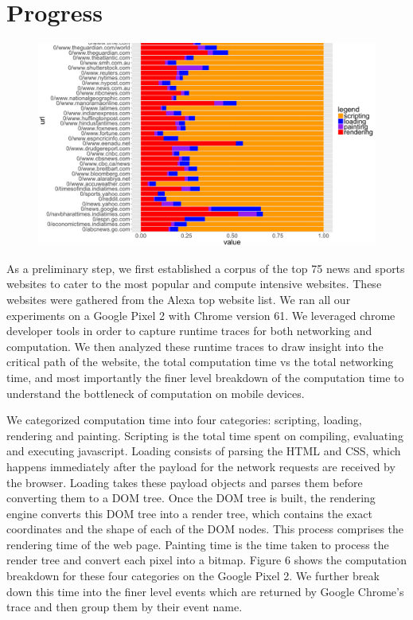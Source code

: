 \section{Progress}
\label{sec:Progress}


\begin{figure}[t!]
\centering
\includegraphics[width=0.99\columnwidth, scale=2.0]{figs/comp_1.png}
\label{fig:act_p2}
\end{figure}

As a preliminary step, we first established a corpus of the top
75 news and sports websites to cater to the most popular and compute intensive websites. 
These websites were gathered from the Alexa top website list.
We ran all our experiments on a Google Pixel 2 with Chrome version 61. We leveraged chrome developer tools in order
to capture runtime traces for both networking and computation. We then analyzed these runtime
traces to draw insight into the critical path of the website, the total computation time vs the total networking time, and most importantly the finer
level breakdown of the computation time to understand the bottleneck of computation on mobile
devices. 

We categorized computation time into four categories: scripting, loading, rendering and
painting. Scripting is the total time spent on
compiling, evaluating and executing javascript. Loading consists of parsing the HTML and CSS, which happens 
immediately after the payload for the network requests are received by the browser. Loading
takes these payload objects and parses them before converting them to a DOM tree. Once the DOM tree is built,
the rendering engine converts this DOM tree into a render tree, which contains the
exact coordinates and the shape of each of the DOM nodes. This process comprises the rendering time of the web page.
Painting time is the time taken to process the render tree and convert
each pixel into a bitmap.
Figure 6 shows the computation breakdown for these four categories
on the Google Pixel 2. We further break down this time into the finer level events
which are returned by Google Chrome's trace and then group them by their event name.

